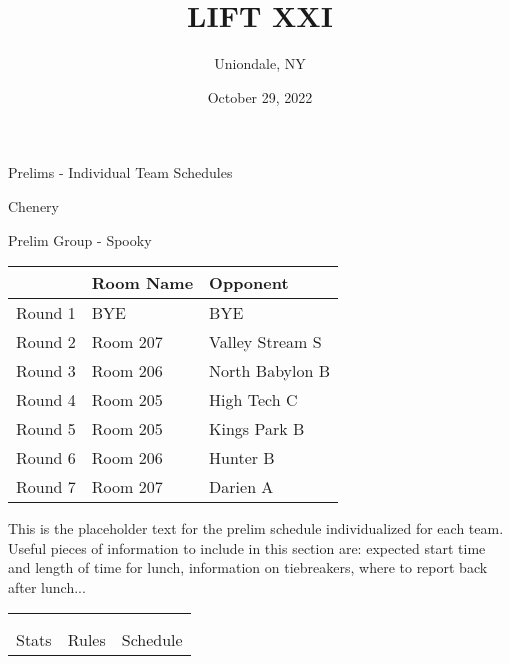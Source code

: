 \documentclass{article}%
\title{LIFT XXI}%
\author{Uniondale, NY}%
\date{October 29, 2022}%
\begin{document}
%
\normalsize%
%
\maketitle%
\vspace*{48pt}%
\begin{center}%
\begin{Huge}%
Prelims {-} Individual Team Schedules%
\end{Huge}%
\end{center}%
\newpage%
\pagestyle{fancy}%
\fancyhf{}%
%
%
%
%
\begin{center}%
\begin{Huge}%
Chenery%
\end{Huge}%
\vspace*{12pt}%
\linebreak%
\begin{Large}%
Prelim Group {-} Spooky%
\end{Large}%
\end{center}%
\vspace*{4pt}%
\begin{tabularx}{\textwidth}{|c|Y|Y|}%
\hline%
&Room Name&Opponent\\%
\hline%
Round 1&BYE&BYE\\%
Round 2&Room 207&Valley Stream S\\%
Round 3&Room 206&North Babylon B\\%
Round 4&Room 205&High Tech C\\%
Round 5&Room 205&Kings Park B\\%
Round 6&Room 206&Hunter B\\%
Round 7&Room 207&Darien A\\%
\hline%
\end{tabularx}%
\vspace*{30pt}%
\linebreak%
This is the placeholder text for the prelim schedule individualized for each team. Useful pieces of information to include in this section are: expected start time and length of time for lunch, information on tiebreakers, where to report back after lunch...%
\vspace*{30pt}%
\newline%
%
\begin{tabularx}{\textwidth}{YYY}%
  &  &  \\%
\\%
Stats&Rules&Schedule\\%
\end{tabularx}%
\end{document}
